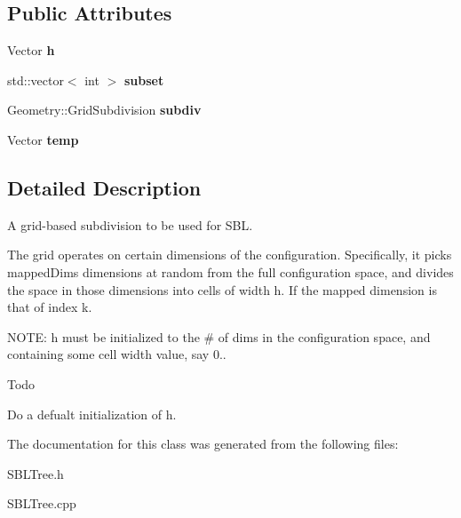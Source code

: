 \subsection*{Public Attributes}
\begin{DoxyCompactItemize}
\item 
Vector {\bfseries h}\label{classSBLSubdivision_ad4726b6334a853199e72461c8428fabc}

\item 
std\+::vector$<$ int $>$ {\bfseries subset}\label{classSBLSubdivision_ac6a572c6a25fc396240e63f4b41ee610}

\item 
Geometry\+::\+Grid\+Subdivision {\bfseries subdiv}\label{classSBLSubdivision_a0f7871c89cf476680167e93a19d92f65}

\item 
Vector {\bfseries temp}\label{classSBLSubdivision_a3a39403d855f390b6120a27028c46fbe}

\end{DoxyCompactItemize}


\subsection{Detailed Description}
A grid-\/based subdivision to be used for S\+BL. 

The grid operates on certain dimensions of the configuration. Specifically, it picks mapped\+Dims dimensions at random from the full configuration space, and divides the space in those dimensions into cells of width h. If the mapped dimension is that of index k.

N\+O\+TE\+: h must be initialized to the \# of dims in the configuration space, and containing some cell width value, say 0.. \begin{DoxyRefDesc}{Todo}
\item[{\bf Todo}]Do a defualt initialization of h. \end{DoxyRefDesc}


The documentation for this class was generated from the following files\+:\begin{DoxyCompactItemize}
\item 
S\+B\+L\+Tree.\+h\item 
S\+B\+L\+Tree.\+cpp\end{DoxyCompactItemize}
